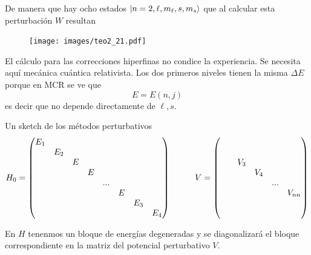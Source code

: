 \documentclass[10pt,oneside]{CBFT_book}
\begin{document}
De manera que hay ocho estados $\Ket{n=2,\ell,m_\ell,s,m_s}$ que al calcular esta perturbación $W$
resultan 
\begin{figure}[htb]
	\begin{center}
	\texttt{[image: images/teo2\_21.pdf]}
	\end{center}
	\caption{}
\end{figure} 

El cálculo para las correcciones hiperfinas no condice la experiencia. Se necesita aquí mecánica cuántica 
relativista. Los dos primeros niveles tienen la misma $\Delta E$ porque en MCR se ve que 
\[
	E = E(n,j) 
\]
es decir que no depende directamente de $\ell,s$.

Un sketch de los métodos perturbativos
\[
	H_0 = \begin{pmatrix}
	       E_1 & \\
	       & E_2 & \\
	       & & E \\
	       & & & E\\
	       & & & & ...\\
	       & & & & & E\\
	       & & & & & & E_3\\
	       & & & & & & & E_4
	      \end{pmatrix}
	      \hspace*{10mm}
	      V =
		\begin{pmatrix}
		& \\
		& \\
		& & V_3 \\
		& & & V_4 \\
		& & & & ... \\
		& & & & & V_{nn} \\
		& \\
		& 
		\end{pmatrix}
\]

En $H$ tenenmos un bloque de energías degeneradas y se diagonalizará el bloque 
correspondiente en la matriz del potencial perturbativo $V$.




\end{document}
